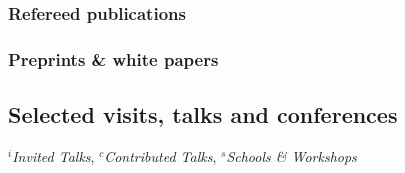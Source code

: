 \documentclass[12pt,letterpaper]{article}
\begin{document}
  \subsubsection{Refereed publications}
  \begin{list}{}{\cvlist}
    
  \end{list}

  \subsubsection{Preprints \& white papers}
  \begin{list}{}{\cvlist}
    
  \end{list}
\fi

\subsection{Selected visits, talks and conferences}
$^i$\emph{Invited Talks}, $^c$\emph{Contributed Talks}, $^s$\emph{Schools \& Workshops}
\end{document}
